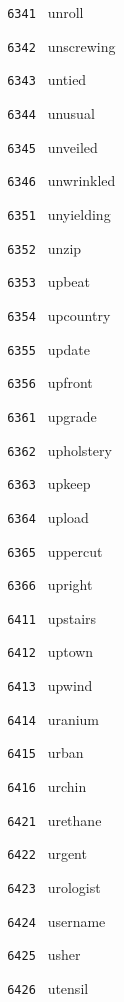 \documentclass[11pt]{article}
\begin{document}
\begin{multicols}{6}
\vspace{3mm}
\noindent \texttt{ 6341 } unroll  \par
\noindent \texttt{ 6342 } unscrewing  \par
\noindent \texttt{ 6343 } untied  \par
\noindent \texttt{ 6344 } unusual  \par
\noindent \texttt{ 6345 } unveiled  \par
\noindent \texttt{ 6346 } unwrinkled  \par
\vspace{3mm}
\noindent \texttt{ 6351 } unyielding  \par
\noindent \texttt{ 6352 } unzip  \par
\noindent \texttt{ 6353 } upbeat  \par
\noindent \texttt{ 6354 } upcountry  \par
\noindent \texttt{ 6355 } update  \par
\noindent \texttt{ 6356 } upfront  \par
\vspace{3mm}
\noindent \texttt{ 6361 } upgrade  \par
\noindent \texttt{ 6362 } upholstery  \par
\noindent \texttt{ 6363 } upkeep  \par
\noindent \texttt{ 6364 } upload  \par
\noindent \texttt{ 6365 } uppercut  \par
\noindent \texttt{ 6366 } upright  \par
\noindent \texttt{ 6411 } upstairs  \par
\noindent \texttt{ 6412 } uptown  \par
\noindent \texttt{ 6413 } upwind  \par
\noindent \texttt{ 6414 } uranium  \par
\noindent \texttt{ 6415 } urban  \par
\noindent \texttt{ 6416 } urchin  \par
\vspace{3mm}
\noindent \texttt{ 6421 } urethane  \par
\noindent \texttt{ 6422 } urgent  \par
\noindent \texttt{ 6423 } urologist  \par
\noindent \texttt{ 6424 } username  \par
\noindent \texttt{ 6425 } usher  \par
\noindent \texttt{ 6426 } utensil  \par

\end{multicols}
\end{document}
